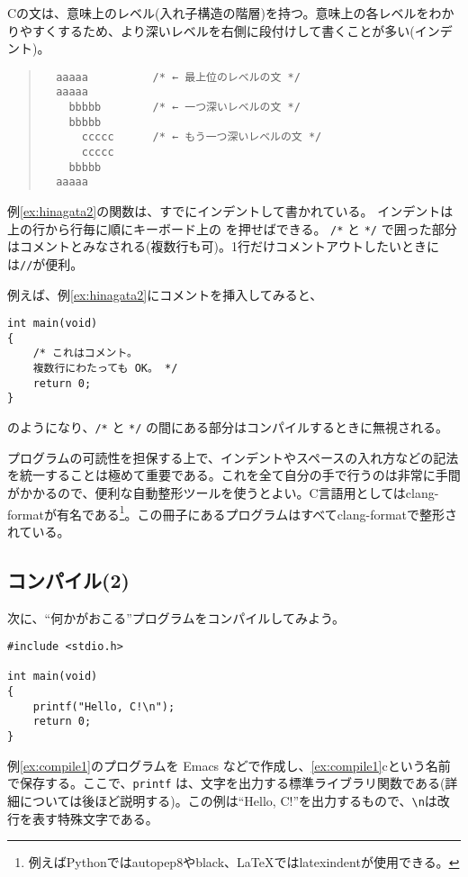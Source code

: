 Cの文は、意味上のレベル(入れ子構造の階層)を持つ。意味上の各レベルをわかりやすくするため、より深いレベルを右側に段付けして書くことが多い(インデント)。
\begin{quote}
    \begin{verbatim}
  aaaaa          /* ← 最上位のレベルの文 */
  aaaaa
    bbbbb        /* ← 一つ深いレベルの文 */
    bbbbb
      ccccc      /* ← もう一つ深いレベルの文 */
      ccccc
    bbbbb
  aaaaa
\end{verbatim}
\end{quote}
例\ref{ex:hinagata2}の関数は、すでにインデントして書かれている。
インデントは上の行から行毎に順にキーボード上の \tabkey を押せばできる。
\texttt{/*} と \texttt{*/} で囲った部分はコメントとみなされる(複数行も可)。1行だけコメントアウトしたいときには\texttt{//}が便利。

例えば、例\ref{ex:hinagata2}にコメントを挿入してみると、
\begin{reidai}
    \begin{verbatim}
int main(void)
{
    /* これはコメント。
    複数行にわたっても OK。 */
    return 0;
}
\end{verbatim}
\end{reidai} \noindent
のようになり、\texttt{/*} と \texttt{*/} の間にある部分はコンパイルするときに無視される。

プログラムの可読性を担保する上で、インデントやスペースの入れ方などの記法を統一することは極めて重要である。これを全て自分の手で行うのは非常に手間がかかるので、便利な自動整形ツールを使うとよい。C言語用としてはclang-formatが有名である\footnote{例えばPythonではautopep8やblack、\LaTeX ではlatexindentが使用できる。}。この冊子にあるプログラムはすべてclang-formatで整形されている。

\subsection{コンパイル(2)}

次に、``何かがおこる''プログラムをコンパイルしてみよう。
\begin{reidai}\label{ex:compile1}
    \begin{verbatim}
#include <stdio.h>

int main(void)
{
    printf("Hello, C!\n");
    return 0;
}
\end{verbatim}
\end{reidai} \noindent
例\ref{ex:compile1}のプログラムを Emacs などで作成し、\ref{ex:compile1}cという名前で保存する。ここで、\texttt{printf} は、文字を出力する標準ライブラリ関数である(詳細については後ほど説明する)。この例は``Hello, C!''を出力するもので、\texttt{\textbackslash n}は改行を表す特殊文字である。

